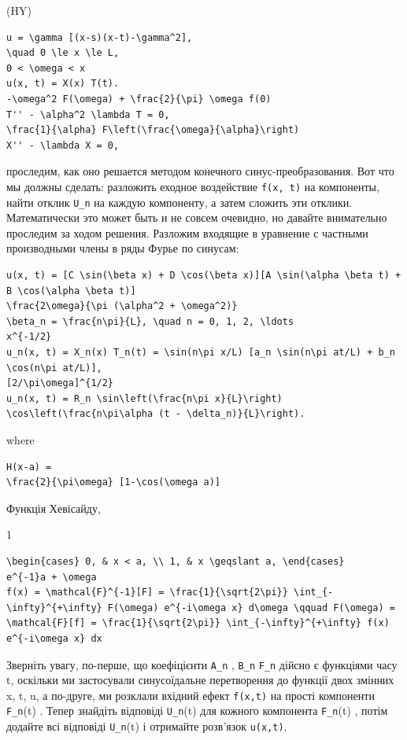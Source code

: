 \documentclass[
  ukrainian,
]{article}
\begin{document}
(HY)

\begin{verbatim}
u = \gamma [(x-s)(x-t)-\gamma^2],
\quad 0 \le x \le L,
0 < \omega < x
u(x, t) = X(x) T(t).
-\omega^2 F(\omega) + \frac{2}{\pi} \omega f(0)
T'' - \alpha^2 \lambda T = 0,
\frac{1}{\alpha} F\left(\frac{\omega}{\alpha}\right)
X'' - \lambda X = 0,
\end{verbatim}

проследим, как оно решается методом конечного синус-преобразования. Вот
что мы должны сделать: разложить еходное воздействие \texttt{f(x,\ t)}
на компоненты, найти отклик \texttt{U\_n} на каждую компоненту, а затем
сложить эти отклики. Математически это может быть и не совсем очевидно,
но давайте внимательно проследим за ходом решения. Разложим входящие в
уравнение с частными производными члены в ряды Фурье по синусам:

\begin{verbatim}
u(x, t) = [C \sin(\beta x) + D \cos(\beta x)][A \sin(\alpha \beta t) + B \cos(\alpha \beta t)]
\frac{2\omega}{\pi (\alpha^2 + \omega^2)}
\beta_n = \frac{n\pi}{L}, \quad n = 0, 1, 2, \ldots
x^{-1/2}
u_n(x, t) = X_n(x) T_n(t) = \sin(n\pi x/L) [a_n \sin(n\pi at/L) + b_n \cos(n\pi at/L)],
[2/\pi\omega]^{1/2}
u_n(x, t) = R_n \sin\left(\frac{n\pi x}{L}\right) \cos\left(\frac{n\pi\alpha (t - \delta_n)}{L}\right).
\end{verbatim}

where

\begin{verbatim}
H(x-a) =
\frac{2}{\pi\omega} [1-\cos(\omega a)]
\end{verbatim}

Функція Хевісайду,

1

\begin{verbatim}
\begin{cases} 0, & x < a, \\ 1, & x \geqslant a, \end{cases}
e^{-1}a + \omega
f(x) = \mathcal{F}^{-1}[F] = \frac{1}{\sqrt{2\pi}} \int_{-\infty}^{+\infty} F(\omega) e^{-i\omega x} d\omega \qquad F(\omega) = \mathcal{F}[f] = \frac{1}{\sqrt{2\pi}} \int_{-\infty}^{+\infty} f(x) e^{-i\omega x} dx
\end{verbatim}

Зверніть увагу, по-перше, що коефіцієнти \texttt{A\_n} , \texttt{B\_n}
\texttt{F\_n} дійсно є функціями часу t, оскільки ми застосували
синусоїдальне перетворення до функції двох змінних x, t, u, а по-друге,
ми розклали вхідний ефект \texttt{f(x,t)} на прості компоненти
\texttt{F\_n}(t) . Тепер знайдіть відповіді \texttt{U\_n}(t) для кожного
компонента \texttt{F\_n}(t) , потім додайте всі відповіді
\texttt{U\_n}(t) і отримайте розв'язок \texttt{u(x,t)}.
\end{document}
